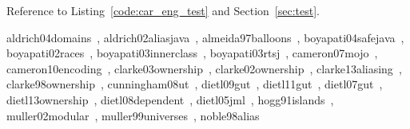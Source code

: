 \documentclass{acm_proc_article-sp}
\begin{document}
Reference to Listing~\ref{code:car_eng_test} and Section~\ref{sec:test}.

aldrich04domains~\cite{aldrich04domains},\newline
aldrich02aliasjava~\cite{aldrich02aliasjava},\newline
almeida97balloons~\cite{almeida97balloons},\newline
boyapati04safejava~\cite{boyapati04safejava},\newline
boyapati02races~\cite{boyapati02races},\newline
boyapati03innerclass~\cite{boyapati03innerclass},\newline
boyapati03rtsj~\cite{boyapati03rtsj},\newline
cameron07mojo~\cite{cameron07mojo},\newline
cameron10encoding~\cite{cameron10encoding},\newline
clarke03ownership~\cite{clarke03ownership},\newline
clarke02ownership~\cite{clarke02ownership},\newline
clarke13aliasing~\cite{clarke13aliasing},\newline
clarke98ownership~\cite{clarke98ownership},\newline
cunningham08ut~\cite{cunningham08ut},\newline
dietl09gut~\cite{dietl09gut},\newline
dietl11gut~\cite{dietl11gut},\newline
dietl07gut~\cite{dietl07gut},\newline
dietl13ownership~\cite{dietl13ownership},\newline
dietl08dependent~\cite{dietl08dependent},\newline
dietl05jml~\cite{dietl05jml},\newline
hogg91islands~\cite{hogg91islands},\newline
muller02modular~\cite{muller02modular},\newline
muller99universes~\cite{muller99universes},\newline
noble98alias~\cite{noble98alias}





\end{document}
